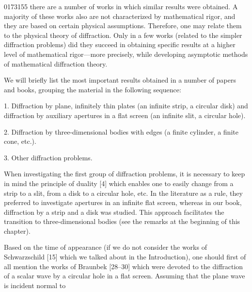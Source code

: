 \begin{scanpage}{0173}{155}
there are a number of works in which similar results were obtained. A majority of these works also are not characterized by mathematical rigor, and they are based on certain physical assumptions. Therefore, one may relate them to the physical theory of diffraction. Only in a few works (related to the simpler diffraction problems) did they succeed in obtaining specific results at a higher level of mathematical rigor---more precisely, while developing asymptotic methods of mathematical diffraction theory.

We will briefly list the most important results obtained in a number of papers and books, grouping the material in the following sequence:

1. Diffraction by plane, infinitely thin plates (an infinite strip, a circular disk) and diffraction by auxiliary apertures in a flat screen (an infinite slit, a circular hole).

2. Diffraction by three-dimensional bodies with edges (a finite cylinder, a finite cone, etc.).

3. Other diffraction problems.

When investigating the first group of diffraction problems, it is necessary to keep in mind the principle of duality [4] which enables one to easily change from a strip to a slit, from a disk to a circular hole, etc. In the literature as a rule, they preferred to investigate apertures in an infinite flat screen, whereas in our book, diffraction by a strip and a disk was studied. This approach facilitates the transition to three-dimensional bodies (see the remarks at the beginning of this chapter).

Based on the time of appearance (if we do not consider the works of Schwarzschild [15] which we talked about in the Introduction), one should first of all mention the works of Braunbek [28--30] which were devoted to the diffraction of a scalar wave by a circular hole in a flat screen. Assuming that the plane wave is incident normal to
\end{scanpage}
